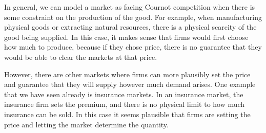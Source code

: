 In general, we can model a market as facing Cournot competition when there is some constraint on the production of the good. For example, when manufacturing physical goods or extracting natural resources, there is a physical scarcity of the good being supplied. In this case, it makes sense that firms would first choose how much to produce, because if they chose price, there is no guarantee that they would be able to clear the markets at that price.

However, there are other markets where firms can more plausibly set the price and guarantee that they will supply however much demand arises. One example that we have seen already is insurance markets. In an insurance market, the insurance firm sets the premium, and there is no physical limit to how much insurance can be sold. In this case it seems plausible that firms are setting the price and letting the market determine the quantity.


